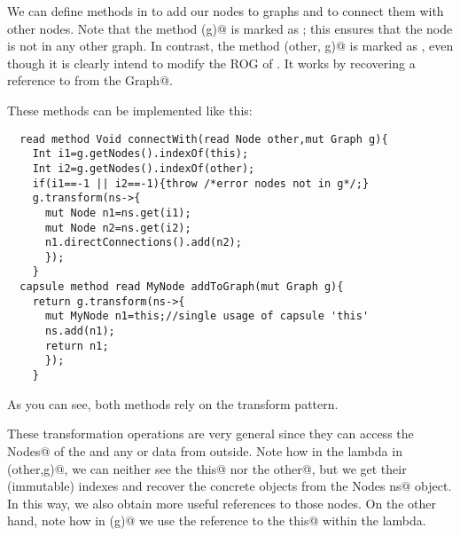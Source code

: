 We can define methods in \Q@MyNode@ to add our nodes
to graphs and to connect them with other nodes.
Note that the method \Q@addToGraph(g)@ is marked as \Q@capsule@; this ensures that the node is not in any other graph.
In contrast, the method \Q@connectWith(other, g)@ is marked as \Q@read@, even though it is clearly intend to modify the ROG of \Q@this@.
It works by recovering a \Q@mut@ reference to \Q@this@ from the \Q@mut Graph@.

These methods can be implemented like this:
\begin{lstlisting}
  read method Void connectWith(read Node other,mut Graph g){
    Int i1=g.getNodes().indexOf(this);
    Int i2=g.getNodes().indexOf(other);
    if(i1==-1 || i2==-1){throw /*error nodes not in g*/;}
    g.transform(ns->{
      mut Node n1=ns.get(i1);
      mut Node n2=ns.get(i2);
      n1.directConnections().add(n2);
      });
    }
  capsule method read MyNode addToGraph(mut Graph g){
    return g.transform(ns->{
      mut MyNode n1=this;//single usage of capsule 'this'
      ns.add(n1);
      return n1;
      });
    }
\end{lstlisting}
As you can see, both methods rely on the transform pattern.

These transformation operations are very general since they
can access the \Q@mut Nodes@ of the \Q@Graph@ and 
any \Q@capsule@ or \Q@imm@ data from outside.
Note how in the lambda in \Q@connectWith(other,g)@, we can neither see the \Q@read this@ nor the \Q@read other@, but we get their (immutable) indexes 
and recover the concrete objects from the \Q@mut Nodes ns@ object.
In this way, we also obtain more useful \Q@mut@ references to those nodes.
On the other hand, note how in \Q@addToGraph(g)@ we use the reference to the \Q@capsule this@ within the lambda.


